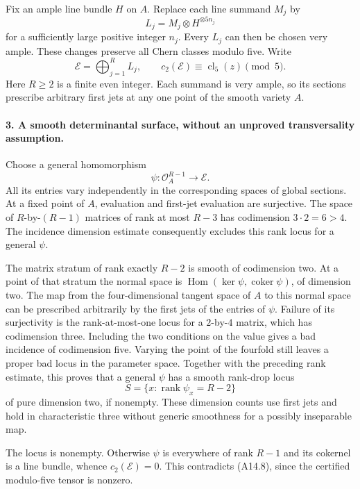 \documentclass[11pt]{article}
\theoremstyle{remark}\newtheorem{remark}[theorem]{Remark}
\begin{document}
Fix an ample line bundle $H$ on $A$. Replace each line summand
$M_j$ by
\[
                        L_j=M_j\otimes H^{\otimes5n_j}
\]
for a sufficiently large positive integer $n_j$. Every $L_j$
can then be chosen very ample. These changes preserve all Chern
classes modulo five. Write
\[
 \mathcal E=\bigoplus_{j=1}^R L_j,\qquad
 c_2(\mathcal E)\equiv\operatorname{cl}_5(z)\pmod5 .             \tag{A14.8}
\]
Here $R\ge2$ is a finite even integer. Each summand is very ample,
so its sections prescribe arbitrary first jets at any one point
of the smooth variety $A$.

\paragraph{3. A smooth determinantal surface, without an unproved
transversality assumption.}
Choose a general homomorphism
\[
                         \psi:\mathcal O_A^{R-1}\longrightarrow
                                      \mathcal E .
                                                               \tag{A14.9}
\]
All its entries vary independently in the corresponding spaces
of global sections. At a fixed point of $A$, evaluation and
first-jet evaluation are surjective. The space of $R$-by-$(R-1)$
matrices of rank at most $R-3$ has codimension
$3\cdot2=6>4$. The incidence dimension estimate consequently
excludes this rank locus for a general $\psi$.

The matrix stratum of rank exactly $R-2$ is smooth of codimension
two. At a point of that stratum the normal space is
$\operatorname{Hom}(\ker\psi,\operatorname{coker}\psi)$, of
dimension two. The map from the four-dimensional tangent space
of $A$ to this normal space can be prescribed arbitrarily by
the first jets of the entries of $\psi$. Failure of its
surjectivity is the rank-at-most-one locus for a $2$-by-$4$
matrix, which has codimension three. Including the two
conditions on the value gives a bad incidence of codimension
five. Varying the point of the fourfold still leaves a proper
bad locus in the parameter space. Together with the preceding
rank estimate, this proves that a general $\psi$ has a smooth
rank-drop locus
\[
                    S=\{x:\operatorname{rank}\psi_x=R-2\}
                                                               \tag{A14.10}
\]
of pure dimension two, if nonempty. These dimension counts use
first jets and hold in characteristic three without generic
smoothness for a possibly inseparable map.

The locus is nonempty. Otherwise $\psi$ is everywhere of rank
$R-1$ and its cokernel is a line bundle, whence
$c_2(\mathcal E)=0$. This contradicts (A14.8), since the certified
modulo-five tensor is nonzero.
\end{document}
